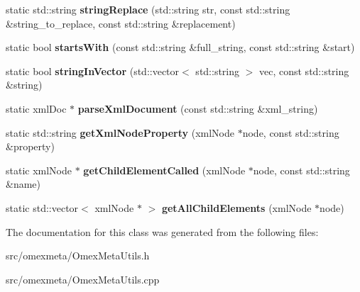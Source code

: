 \begin{DoxyCompactItemize}
static std\+::string {\bfseries string\+Replace} (std\+::string str, const std\+::string \&string\+\_\+to\+\_\+replace, const std\+::string \&replacement)
\item 
\mbox{\label{classomexmeta_1_1OmexMetaUtils_a66d58e0ebcbee1857b23ead70c87de7f}} 
static bool {\bfseries starts\+With} (const std\+::string \&full\+\_\+string, const std\+::string \&start)
\item 
\mbox{\label{classomexmeta_1_1OmexMetaUtils_a6f8e406b8798bd2f1f0ae0d1bd07ed2b}} 
static bool {\bfseries string\+In\+Vector} (std\+::vector$<$ std\+::string $>$ vec, const std\+::string \&string)
\item 
\mbox{\label{classomexmeta_1_1OmexMetaUtils_a718710d8ba7fc7598bd73a5456b3d903}} 
static xml\+Doc $\ast$ {\bfseries parse\+Xml\+Document} (const std\+::string \&xml\+\_\+string)
\item 
\mbox{\label{classomexmeta_1_1OmexMetaUtils_a29cc8222c809162eadbc424a0687cbf3}} 
static std\+::string {\bfseries get\+Xml\+Node\+Property} (xml\+Node $\ast$node, const std\+::string \&property)
\item 
\mbox{\label{classomexmeta_1_1OmexMetaUtils_a1dbcd874b2b72531e7f4f9e82524d8e8}} 
static xml\+Node $\ast$ {\bfseries get\+Child\+Element\+Called} (xml\+Node $\ast$node, const std\+::string \&name)
\item 
\mbox{\label{classomexmeta_1_1OmexMetaUtils_a4d6f7d2140c42435be9339edf975b949}} 
static std\+::vector$<$ xml\+Node $\ast$ $>$ {\bfseries get\+All\+Child\+Elements} (xml\+Node $\ast$node)
\end{DoxyCompactItemize}


The documentation for this class was generated from the following files\+:\begin{DoxyCompactItemize}
\item 
src/omexmeta/Omex\+Meta\+Utils.\+h\item 
src/omexmeta/Omex\+Meta\+Utils.\+cpp\end{DoxyCompactItemize}

